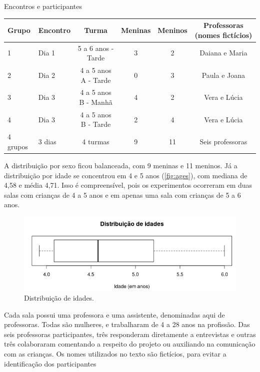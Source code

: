  \begin{quadro}[!h]
 		\setlength{\extrarowheight}{3pt}
        \begin{center}
        \caption{Encontros e participantes}
        \label{quadro:participants}
        \begin{tabular}{@{}llcccc@{}}
            \toprule
            Grupo & Encontro & Turma                    & Meninas & Meninos & Professoras (nomes fictícios) \\ \midrule
            1     & Dia 1    & 5 a 6 anos - Tarde       & 3       & 2       & Daiana e Maria \\
            2     & Dia 2    & 4 a 5 anos A - Tarde     & 0       & 3       & Paula e Joana \\
            3     & Dia 3    & 4 a 5 anos B - Manhã     & 4       & 2       & Vera e Lúcia \\
            4     & Dia 3    & 4 a 5 anos B - Tarde     & 2       & 4       & Vera e Lúcia \\ \midrule
            4 grupos   & 3 dias & 4 turmas              & 9       & 11      & Seis professoras \\ \bottomrule 
            \end{tabular}
        \end{center}
        \sourceauthor
    \end{quadro}

A distribuição por sexo ficou balanceada, com 9 meninas e 11 meninos. Já a distribuição por idade se concentrou em 4 e 5 anos (\autoref{fig:ages}), com mediana de 4,58 e média 4,71. Isso é compreensível, pois os experimentos ocorreram em duas salas com crianças de 4 a 5 anos e em apenas uma sala com crianças de 5 a 6 anos.

\begin{figure}[!htpb]
    \centering
    \includegraphics[width=.6\linewidth,fbox]{figs/ages.png}
    \caption{Distribuição de idades.}
    \sourceauthor
    \label{fig:ages}
\end{figure}

Cada sala possui uma professora e uma assistente, denominadas aqui de professoras. Todas são mulheres, e trabalharam de 4 a 28 anos na profissão. Das seis professoras participantes, três responderam diretamente a entrevistas e outras três colaboraram comentando a respeito do projeto ou auxiliando na comunicação com as crianças. Os nomes utilizados no texto são fictícios, para evitar a identificação dos participantes

